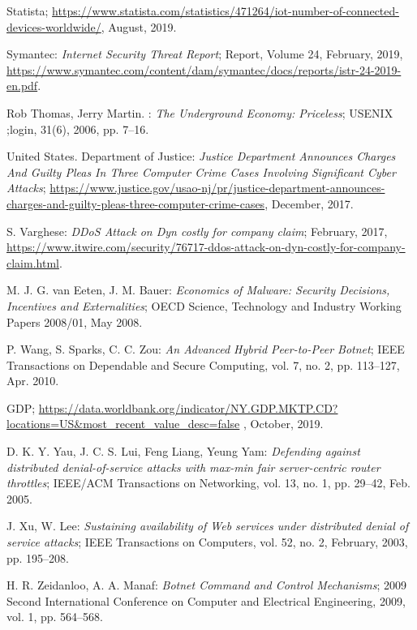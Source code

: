 \begin{thebibliography}{99}
 Statista; \url{https://www.statista.com/statistics/471264/iot-number-of-connected-devices-worldwide/}, August, 2019.

 Symantec: \emph{Internet Security Threat Report}; Report, Volume 24, February, 2019, \url{https://www.symantec.com/content/dam/symantec/docs/reports/istr-24-2019-en.pdf}.

 Rob Thomas, Jerry Martin. : \emph{The Underground Economy: Priceless}; USENIX ;login, 31(6), 2006, pp. 7--16.

 United States. Department of Justice: \emph{Justice Department Announces Charges And Guilty Pleas In Three Computer Crime Cases Involving Significant Cyber Attacks}; \url{https://www.justice.gov/usao-nj/pr/justice-department-announces-charges-and-guilty-pleas-three-computer-crime-cases}, December, 2017.

 S. Varghese: \emph{DDoS Attack on Dyn costly for company claim}; February, 2017, \url{https://www.itwire.com/security/76717-ddos-attack-on-dyn-costly-for-company-claim.html}.

 M. J. G. van Eeten, J. M. Bauer: \emph{Economics of Malware: Security Decisions, Incentives and Externalities}; OECD Science, Technology and Industry Working Papers 2008/01, May 2008.

 P. Wang, S. Sparks, C. C. Zou: \emph{An Advanced Hybrid Peer-to-Peer Botnet}; IEEE Transactions on Dependable and Secure Computing, vol. 7, no. 2, pp. 113--127, Apr. 2010.

 GDP; \url{https://data.worldbank.org/indicator/NY.GDP.MKTP.CD?locations=US&most_recent_value_desc=false} , October, 2019.

 D. K. Y. Yau, J. C. S. Lui, Feng Liang, Yeung Yam: \emph{Defending against distributed denial-of-service attacks with max-min fair server-centric router throttles}; IEEE/ACM Transactions on Networking, vol. 13, no. 1, pp. 29--42, Feb. 2005.

 J. Xu, W. Lee: \emph{Sustaining availability of Web services under distributed denial of service attacks}; IEEE Transactions on Computers, vol. 52, no. 2, February, 2003, pp. 195--208.

 H. R. Zeidanloo, A. A. Manaf: \emph{Botnet Command and Control Mechanisms}; 2009 Second International Conference on Computer and Electrical Engineering, 2009, vol. 1, pp. 564--568.

\end{thebibliography}



